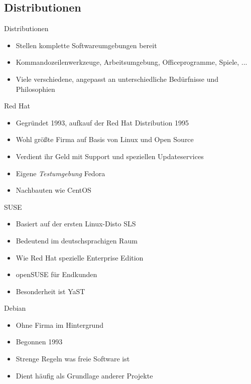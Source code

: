 \documentclass[aspectratio=43]{beamer}
\begin{document}
\subsection{Distributionen}
\begin{frame} 

	\begin{block}{Distributionen} 
	\begin{itemize}
	\item Stellen komplette Softwareumgebungen bereit
	\item Kommandozeilenwerkzeuge, Arbeitsumgebung, Officeprogramme, Spiele, ...
	\item Viele verschiedene, angepasst an unterschiedliche Bedürfnisse und Philosophien 
	\end{itemize}
	\end{block}

	\begin{block}{Red Hat} 
	\begin{itemize}
	\item Gegründet 1993, aufkauf der Red Hat Distribution 1995
	\item Wohl größte Firma auf Basis von Linux und Open Source
	\item Verdient ihr Geld mit Support und speziellen Updateservices
	\item Eigene \textit{Testumgebung} Fedora
	\item Nachbauten wie CentOS
	\end{itemize}
	\end{block}

	
\end{frame}

\begin{frame} 

	\begin{block}{SUSE} 
	\begin{itemize}
	\item Basiert auf der ersten Linux-Disto SLS
	\item Bedeutend im deutschsprachigen Raum
	\item Wie Red Hat spezielle Enterprise Edition
	\item openSUSE für Endkunden
	\item Besonderheit ist YaST
	\end{itemize}
	\end{block}

	\begin{block}{Debian} 
	\begin{itemize}
	\item Ohne Firma im Hintergrund
	\item Begonnen 1993
	\item Strenge Regeln was freie Software ist
	\item Dient häufig als Grundlage anderer Projekte
	\end{itemize}
	\end{block}

	
\end{frame}
\end{document}
